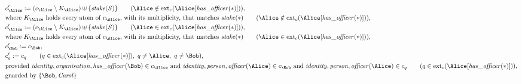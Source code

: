 \begin{align*}
&
c'_
{
\Alice
}
 := 
(
c_
{
\Alice
}
 \setminus K_
{
\Alice
}
) \uplus 
\{
\mathit{\detokenize{
stake
}}
(
S
)
\}
 \qquad (
\Alice
 \notin 
\mathrm{ext}_c(
\Alice
[
\mathit{\detokenize{
has_officer
}}
(
\ast
)
]
)
)
,\\
&
\text{where } K_
{
\Alice
}
 \text{ holds every atom of } c_
{
\Alice
}
 \text{, with its multiplicity, that matches } 
\mathit{\detokenize{
stake
}}
(
\ast
)
 \qquad (
\Alice
 \notin 
\mathrm{ext}_c(
\Alice
[
\mathit{\detokenize{
has_officer
}}
(
\ast
)
]
)
)
,\\
&
c'_
{
\Alice
}
 := 
(
c_
{
\Alice
}
 \setminus K_
{
\Alice
}
) \uplus 
\{
\mathit{\detokenize{
stake
}}
(
S
)
\}
 \qquad (
\Alice
 \in 
\mathrm{ext}_c(
\Alice
[
\mathit{\detokenize{
has_officer
}}
(
\ast
)
]
)
)
,\\
&
\text{where } K_
{
\Alice
}
 \text{ holds every atom of } c_
{
\Alice
}
 \text{, with its multiplicity, that matches } 
\mathit{\detokenize{
stake
}}
(
\ast
)
 \qquad (
\Alice
 \in 
\mathrm{ext}_c(
\Alice
[
\mathit{\detokenize{
has_officer
}}
(
\ast
)
]
)
)
,\\
&
c'_
{
\Bob
}
 := 
c_
{
\Bob
}
,\\
&
c'_
q
 := 
c_
q
 \qquad (
q
 \in 
\mathrm{ext}_c(
\Alice
[
\mathit{\detokenize{
has_officer
}}
(
\ast
)
]
)
,\ 
q \neq 
\Alice
,\ 
q \neq 
\Bob
)
,\\
&
\text{provided } 
\mathit{\detokenize{
identity
}}
,
\mathit{\detokenize{
organisation
}}
,
\mathit{\detokenize{
has_officer
}}
(
\Bob
)
 \in c_
{
\Alice
}
 \text{ and } 
\mathit{\detokenize{
identity
}}
,
\mathit{\detokenize{
person
}}
,
\mathit{\detokenize{
officer
}}
(
\Alice
)
 \in c_
{
\Bob
}
 \text{ and } 
\mathit{\detokenize{
identity
}}
,
\mathit{\detokenize{
person
}}
,
\mathit{\detokenize{
officer
}}
(
\Alice
)
 \in c_
q
 \qquad (
q \in 
\mathrm{ext}_c(
\Alice
[
\mathit{\detokenize{
has_officer
}}
(
\ast
)
]
)
)
,\\
&
\text{guarded by } \{
\Bob
,
\mathit{Carol}
\}
\end{align*}

